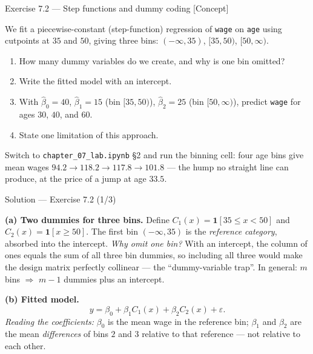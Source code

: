 \documentclass[aspectratio=169,11pt]{beamer}
\begin{document}
\begin{frame}{Exercise 7.2 --- Step functions and dummy coding [Concept]}
\begin{exercise}
We fit a piecewise-constant (step-function) regression of \texttt{wage} on \texttt{age} using cutpoints at $35$ and $50$, giving three bins: $(-\infty,35)$, $[35,50)$, $[50,\infty)$.
\begin{enumerate}
  \item How many dummy variables do we create, and why is one bin omitted?
  \item Write the fitted model with an intercept.
  \item With $\hat\beta_0=40$, $\hat\beta_1=15$ (bin $[35,50)$), $\hat\beta_2=25$ (bin $[50,\infty)$), predict \texttt{wage} for ages $30$, $40$, and $60$.
  \item State one limitation of this approach.
\end{enumerate}
\end{exercise}
\begin{labnote}
  Switch to \texttt{chapter\_07\_lab.ipynb} \S2 and run the binning cell: four age bins give mean wages $94.2 \to 118.2 \to 117.8 \to 101.8$ --- the hump no straight line can produce, at the price of a jump at age $33.5$.
\end{labnote}
\end{frame}

\begin{frame}{Solution --- Exercise 7.2 (1/3)}
\begin{solutionbox}
\textbf{(a) Two dummies for three bins.} Define $C_1(x)=\mathbf{1}[35\le x<50]$ and $C_2(x)=\mathbf{1}[x\ge 50]$. The first bin $(-\infty,35)$ is the \emph{reference category}, absorbed into the intercept. \emph{Why omit one bin?} With an intercept, the column of ones equals the sum of all three bin dummies, so including all three would make the design matrix perfectly collinear --- the ``dummy-variable trap''. In general: $m$ bins $\Rightarrow$ $m-1$ dummies plus an intercept.

\medskip
\textbf{(b) Fitted model.}
\[ y=\beta_0+\beta_1 C_1(x)+\beta_2 C_2(x)+\varepsilon. \]
\emph{Reading the coefficients:} $\beta_0$ is the mean wage in the reference bin; $\beta_1$ and $\beta_2$ are the mean \emph{differences} of bins $2$ and $3$ relative to that reference --- not relative to each other.
\end{solutionbox}
\end{frame}
\end{document}
